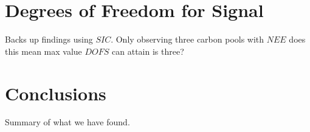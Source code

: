 \documentclass[11pt]{article}
\begin{document}
\section*{Degrees of Freedom for Signal}
Backs up findings using $SIC$. Only observing three carbon pools with $NEE$ does this mean max value $DOFS$ can attain is three?

\section*{Conclusions}
Summary of what we have found.


{}

\end{document}
